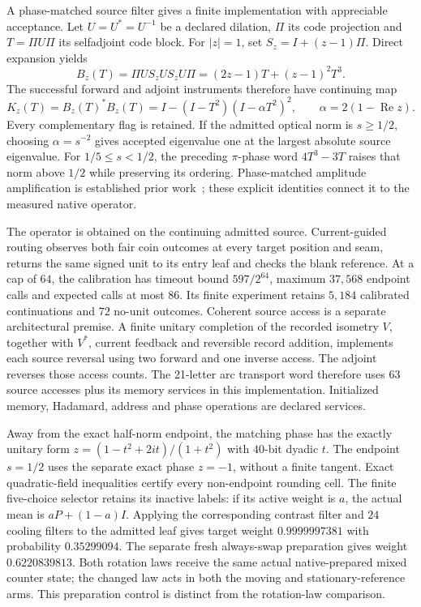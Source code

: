A phase-matched source filter gives a finite implementation with appreciable
acceptance. Let $U=U^*=U^{-1}$ be a declared dilation, $\Pi$ its code
projection and $T=\Pi U\Pi$ its selfadjoint code block. For $|z|=1$, set
$S_z=I+(z-1)\Pi$. Direct expansion yields
\[
 B_z(T)=\Pi U S_z U S_z U\Pi
       =(2z-1)T+(z-1)^2T^3.
\]
The successful forward and adjoint instruments therefore have continuing map
\[
 K_z(T)=B_z(T)^*B_z(T)
       =I-(I-T^2)(I-\alpha T^2)^2,
 \qquad \alpha=2(1-\operatorname{Re}z).
\]
Every complementary flag is retained. If the admitted optical norm is
$s\geq1/2$, choosing $\alpha=s^{-2}$ gives accepted eigenvalue one at the
largest absolute source eigenvalue. For $1/5\leq s<1/2$, the preceding
$\pi$-phase word $4T^3-3T$ raises that norm above $1/2$ while preserving
its ordering. Phase-matched amplitude amplification is established
prior work~\cite{hoyer2000phases,brassard2002amplification}; these explicit
identities connect it to the measured native operator.

The operator is obtained on the continuing admitted source. Current-guided
routing observes both fair coin outcomes at every target position and seam,
returns the same signed unit to its entry leaf and checks the blank reference.
At a cap of $64$, the calibration has timeout bound $597/2^{64}$, maximum
$37{,}568$ endpoint calls and expected calls at most $86$. Its finite
experiment retains $5{,}184$ calibrated continuations and $72$ no-unit
outcomes. Coherent source access is a separate architectural premise.
A finite unitary completion of the recorded isometry $V$, together with
$V^*$, current feedback and reversible record addition, implements each
source reversal using two forward and one inverse access. The adjoint
reverses those access counts. The 21-letter arc transport word therefore
uses 63 source accesses plus its memory services in this implementation. Initialized memory, Hadamard, address and
phase operations are declared services.

Away from the exact half-norm endpoint, the matching phase has the exactly
unitary form $z=(1-t^2+2it)/(1+t^2)$ with $40$-bit dyadic $t$. The endpoint
$s=1/2$ uses the separate exact phase $z=-1$, without a finite tangent.
Exact quadratic-field inequalities certify every non-endpoint rounding cell.
The finite five-choice selector retains its inactive labels: if its active
weight is $a$, the actual mean is $aP+(1-a)I$. Applying the corresponding
contrast filter and $24$ cooling filters to the admitted leaf gives target
weight $0.9999997381$ with probability $0.35299094$. The separate fresh
always-swap preparation gives weight $0.6220839813$. Both rotation laws
receive the same actual native-prepared mixed counter state; the changed law
acts in both the moving and stationary-reference arms. This preparation
control is distinct from the rotation-law comparison.

